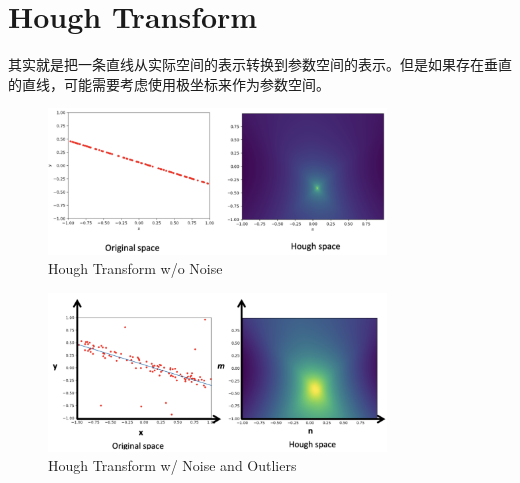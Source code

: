 \section{Hough Transform}

其实就是把一条直线从实际空间的表示转换到参数空间的表示。但是如果存在垂直的直线，可能需要考虑使用极坐标来作为参数空间。

\begin{figure}[htbp]
    \centering
    \includegraphics[width=0.8\textwidth]{figures/hough1.png}
    \caption{Hough Transform w/o Noise}
\end{figure}

\begin{figure}[htbp]
    \centering
    \includegraphics[width=0.8\textwidth]{figures/hough2.png}
    \caption{Hough Transform w/ Noise and Outliers}
\end{figure}